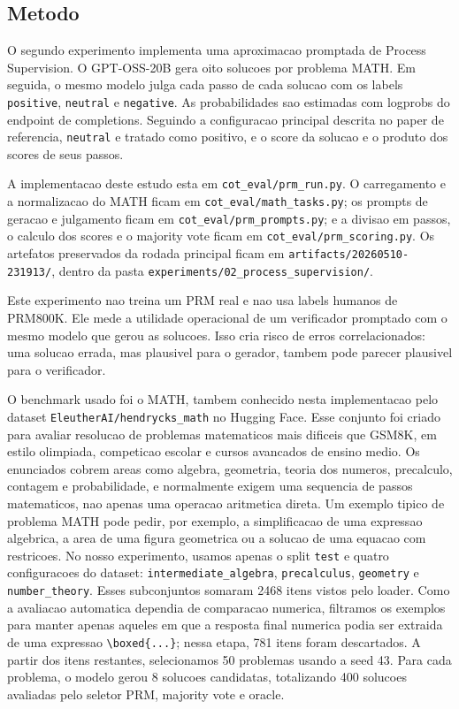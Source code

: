 \documentclass[a4paper,12pt]{article}
\begin{document}
\subsection{Metodo}

O segundo experimento implementa uma aproximacao promptada de Process
Supervision. O GPT-OSS-20B gera oito solucoes por problema MATH. Em seguida, o
mesmo modelo julga cada passo de cada solucao com os labels
\texttt{positive}, \texttt{neutral} e \texttt{negative}. As probabilidades sao
estimadas com logprobs do endpoint de completions. Seguindo a configuracao
principal descrita no paper de referencia, \texttt{neutral} e tratado como
positivo, e o score da solucao e o produto dos scores de seus passos.

A implementacao deste estudo esta em \texttt{cot\_eval/prm\_run.py}. O
carregamento e a normalizacao do MATH ficam em \texttt{cot\_eval/math\_tasks.py};
os prompts de geracao e julgamento ficam em \texttt{cot\_eval/prm\_prompts.py};
e a divisao em passos, o calculo dos scores e o majority vote ficam em
\texttt{cot\_eval/prm\_scoring.py}. Os artefatos preservados da rodada
principal ficam em \texttt{artifacts/20260510-231913/}, dentro da pasta
\texttt{experiments/02\_process\_supervision/}.

Este experimento nao treina um PRM real e nao usa labels humanos de PRM800K.
Ele mede a utilidade operacional de um verificador promptado com o mesmo modelo
que gerou as solucoes. Isso cria risco de erros correlacionados: uma solucao
errada, mas plausivel para o gerador, tambem pode parecer plausivel para o
verificador.

O benchmark usado foi o MATH, tambem conhecido nesta implementacao pelo dataset
\texttt{EleutherAI/hendrycks\_math} no Hugging Face. Esse conjunto foi criado
para avaliar resolucao de problemas matematicos mais dificeis que GSM8K, em
estilo olimpiada, competicao escolar e cursos avancados de ensino medio. Os
enunciados cobrem areas como algebra, geometria, teoria dos numeros,
precalculo, contagem e probabilidade, e normalmente exigem uma sequencia de
passos matematicos, nao apenas uma operacao aritmetica direta. Um exemplo
tipico de problema MATH pode pedir, por exemplo, a simplificacao de uma
expressao algebrica, a area de uma figura geometrica ou a solucao de uma
equacao com restricoes. No nosso experimento, usamos apenas o split
\texttt{test} e quatro configuracoes do dataset:
\texttt{intermediate\_algebra}, \texttt{precalculus}, \texttt{geometry} e
\texttt{number\_theory}. Esses subconjuntos somaram 2468 itens vistos pelo
loader. Como a avaliacao automatica dependia de comparacao numerica, filtramos
os exemplos para manter apenas aqueles em que a resposta final numerica podia
ser extraida de uma expressao \verb|\boxed{...}|; nessa etapa, 781 itens foram
descartados. A partir dos itens restantes, selecionamos 50 problemas usando a
seed 43. Para cada problema, o modelo gerou 8 solucoes candidatas, totalizando
400 solucoes avaliadas pelo seletor PRM, majority vote e oracle.
\end{document}
